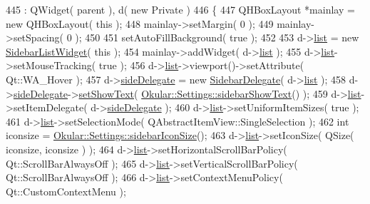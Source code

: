 \begin{DoxyCode}
445     : QWidget( parent ), d( \textcolor{keyword}{new} Private )
446 \{
447     QHBoxLayout *mainlay = \textcolor{keyword}{new} QHBoxLayout( \textcolor{keyword}{this} );
448     mainlay->setMargin( 0 );
449     mainlay->setSpacing( 0 );
450 
451     setAutoFillBackground( \textcolor{keyword}{true} );
452 
453     d->\hyperlink{classSidebar_1_1Private_a0b3cabc80bb0d0d9259723cbe786908e}{list} = \textcolor{keyword}{new} \hyperlink{classSidebarListWidget}{SidebarListWidget}( \textcolor{keyword}{this} );
454     mainlay->addWidget( d->\hyperlink{classSidebar_1_1Private_a0b3cabc80bb0d0d9259723cbe786908e}{list} );
455     d->\hyperlink{classSidebar_1_1Private_a0b3cabc80bb0d0d9259723cbe786908e}{list}->setMouseTracking( \textcolor{keyword}{true} );
456     d->\hyperlink{classSidebar_1_1Private_a0b3cabc80bb0d0d9259723cbe786908e}{list}->viewport()->setAttribute( Qt::WA\_Hover );
457     d->\hyperlink{classSidebar_1_1Private_a25b75ddd6cbb379f77f71207ad627d54}{sideDelegate} = \textcolor{keyword}{new} \hyperlink{classSidebarDelegate}{SidebarDelegate}( d->\hyperlink{classSidebar_1_1Private_a0b3cabc80bb0d0d9259723cbe786908e}{list} );
458     d->\hyperlink{classSidebar_1_1Private_a25b75ddd6cbb379f77f71207ad627d54}{sideDelegate}->\hyperlink{classSidebarDelegate_a34dd8d82dc4a30ae4256027b1df5389e}{setShowText}( 
      \hyperlink{classOkular_1_1Settings_ac62d059c9ffd6c8a6ed9da3fd5bbcb7b}{Okular::Settings::sidebarShowText}() );
459     d->\hyperlink{classSidebar_1_1Private_a0b3cabc80bb0d0d9259723cbe786908e}{list}->setItemDelegate( d->\hyperlink{classSidebar_1_1Private_a25b75ddd6cbb379f77f71207ad627d54}{sideDelegate} );
460     d->\hyperlink{classSidebar_1_1Private_a0b3cabc80bb0d0d9259723cbe786908e}{list}->setUniformItemSizes( \textcolor{keyword}{true} );
461     d->\hyperlink{classSidebar_1_1Private_a0b3cabc80bb0d0d9259723cbe786908e}{list}->setSelectionMode( QAbstractItemView::SingleSelection );
462     \textcolor{keywordtype}{int} iconsize = \hyperlink{classOkular_1_1Settings_a7315fd4eb5b604d22ca0b4b0ac6231fc}{Okular::Settings::sidebarIconSize}();
463     d->\hyperlink{classSidebar_1_1Private_a0b3cabc80bb0d0d9259723cbe786908e}{list}->setIconSize( QSize( iconsize, iconsize ) );
464     d->\hyperlink{classSidebar_1_1Private_a0b3cabc80bb0d0d9259723cbe786908e}{list}->setHorizontalScrollBarPolicy( Qt::ScrollBarAlwaysOff );
465     d->\hyperlink{classSidebar_1_1Private_a0b3cabc80bb0d0d9259723cbe786908e}{list}->setVerticalScrollBarPolicy( Qt::ScrollBarAlwaysOff );
466     d->\hyperlink{classSidebar_1_1Private_a0b3cabc80bb0d0d9259723cbe786908e}{list}->setContextMenuPolicy( Qt::CustomContextMenu );

\end{DoxyCode}

